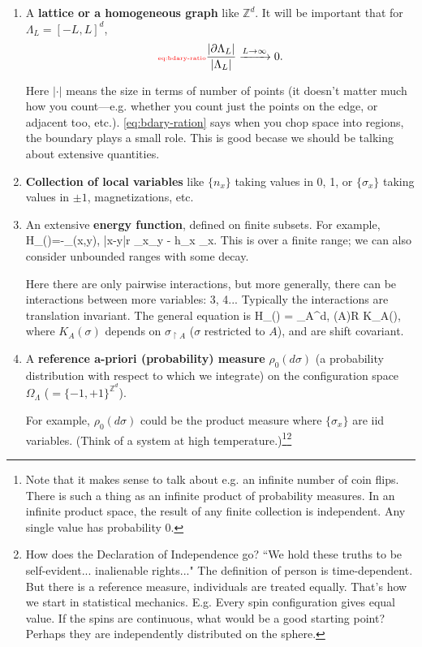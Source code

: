 \documentclass[12pt]{book}
\theoremstyle{norm}
\begin{document}
\begin{enumerate}
\item
A \textbf{lattice or a homogeneous graph} like $\mathbb{Z}^d$. %
It will be important that for $\Lambda_L=[-L,L]^d$, 
\begin{equation}\label{eq:bdary-ratio}\text{{\color{red}\tiny eq:bdary-ratio}}
\frac{|\partial \Lambda_L|}{|\Lambda_L|} \xrightarrow{L\to \infty} 0.
\end{equation}

Here $|\cdot|$ means the size in terms of number of points (it doesn't matter much how you count---e.g. whether you count just the points on the edge, or adjacent too, etc.). \eqref{eq:bdary-ration} says when you chop space into regions, the boundary plays a small role. This is good becase we should be talking about extensive quantities.
\item
\textbf{Collection of local variables} like $\{n_x\}$ taking values in 0, 1, or $\{\sigma_x\}$ taking values in $\pm1$, magnetizations, etc.
\item
An extensive \textbf{energy function}, defined on finite subsets. 
For example, 
\be
H_{\Lambda}(\sigma)=-\sum_{(x,y)\subset \Lambda, |x-y|\le r}%
\sigma_x\sigma_y - h\sum_{x\in \Lambda} \sigma_x.
\ee
This is over a finite range; we can also consider unbounded ranges with some decay.

Here there are only pairwise interactions, but more generally, there can be interactions between more variables: 3, 4... Typically the interactions are translation invariant. The general equation is
\be
H_{\Lambda}(\sigma) = \sum_{A\subset {}^d, (A)\le R} K_A(\sigma),
\ee
where $K_A(\sigma)$ depends on $\sigma_{\upharpoonright A}$ ($\sigma$ restricted to $A$), and are shift covariant.

\item
A \textbf{reference a-priori (probability) measure} $\rho_0(d\sigma)$ (a probability distribution with respect to which we integrate) on the configuration space $\Omega_\Lambda$ ($=\{-1,+1\}^{\mathbb{Z}^d}$).

For example, $\rho_0(d\sigma)$ could be the product measure where $\{\sigma_x\}$ are iid variables. (Think of a system at high temperature.)\footnote{Note that it makes sense to talk about e.g. an infinite number of coin flips. There is such a thing as an infinite product of probability measures. In an infinite product space, the result of any finite collection is independent.  Any single value has probability 0.}\footnote{How does the Declaration of Independence go? ``We hold these truths to be self-evident... inalienable rights..." The definition of person is time-dependent. But there is a reference measure, individuals are treated equally. That's how we start in statistical mechanics. E.g. Every spin configuration gives equal value. If the spins are continuous, what would be a good starting point? Perhaps they are independently distributed on the sphere.}


\end{enumerate}
\end{document}
